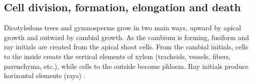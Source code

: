 \subsection{Cell division, formation, elongation and death}
Dicotyledons trees and gymnosperms grow in two main ways, upward by apical growth and
outward by cambial growth.  As the cambium is forming, fusiform and ray initials
are created from the apical shoot cells. From the cambial initials,
cells to the inside create the vertical elements of xylem (tracheids, vessels,
fibers, parenchyma, etc.), while cells to the outside become phloem. Ray
initials produce horizontal elements (rays) \citep{fromm2013cellular}.
